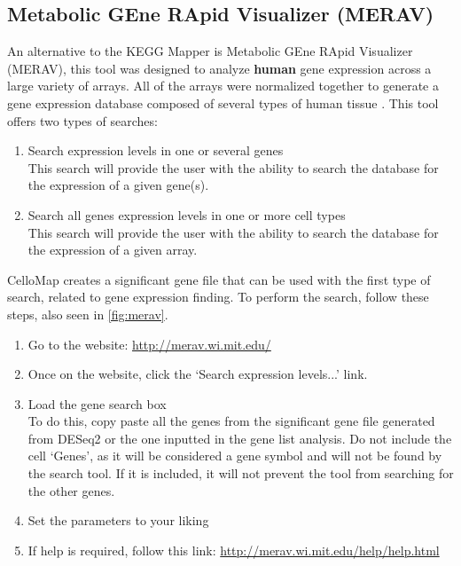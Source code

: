 \documentclass[11pt]{article}
\begin{document}
\subsection{Metabolic GEne RApid Visualizer (MERAV)\label{MERAV}}
An alternative to the \acrshort{KEGG} Mapper is Metabolic GEne RApid Visualizer (\acrshort{MERAV}), this tool was designed to analyze \textbf{human} gene expression across a large variety of arrays. All of the arrays were normalized together to generate a gene expression database composed of several types of human tissue \cite{shaul2015merav}.
This tool offers two types of searches:
\begin{enumerate}
\item Search expression levels in one or several genes\\
This search will provide the user with the ability to search the database for the expression of a given gene(s).
\item Search all genes expression levels in one or more cell types\\
This search will provide the user with the ability to search the database for the expression of a given array.
\end{enumerate}

CelloMap creates a significant gene file that can be used with the first type of search, related to gene expression finding. To perform the search, follow these steps, also seen in \autoref{fig:merav}.
\begin{enumerate}
\item Go to the website: \url{http://merav.wi.mit.edu/}
\item Once on the website, click the `Search expression levels...' link.
\item Load the gene search box\\
To do this, copy paste all the genes from the significant gene file generated from \acrshort{DESeq2} or the one inputted in the gene list analysis. Do not include the cell `Genes', as it will be considered a gene symbol and will not be found by the search tool. If it is included, it will not prevent the tool from searching for the other genes.
\item Set the parameters to your liking
\item If help is required, follow this link: \url{http://merav.wi.mit.edu/help/help.html}
\end{enumerate}
\end{document}
